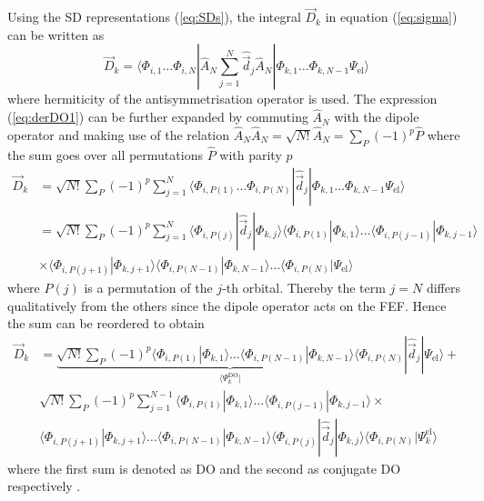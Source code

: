 Using the SD representations (\ref{eq:SDs}), the integral $\vec{D}_k$ in equation (\ref{eq:sigma}) can be written as
\begin{equation} \label{eq:derDO1}
\vec{D}_k = \langle
\Phi_{i,1}  \hdots\Phi_{i,N} | \hat{A}_N \sum_{j=1}^N\hat{\vec{d}}_j \hat{A}_N |
\Phi_{k,1}\hdots\Phi_{k,N-1} \Psi_\text{el} 
\rangle 
\end{equation}
where hermiticity of the antisymmetrisation operator is used.
The expression (\ref{eq:derDO1}) can be further expanded by commuting $\hat{A}_N$ with the dipole operator and making use of the relation $\hat{A}_N\hat{A}_N=\sqrt{N!}\hat{A}_N=\sum_P (-1)^p \hat{P}$ where the sum goes over all permutations $\hat{P}$ with parity $p$
\begin{align} \label{eq:derDO2}
\vec{D}_k & = \sqrt{N!}\sum_P (-1)^p \sum_{j=1}^N \langle
\Phi_{i,P(1)}\hdots\Phi_{i,P(N)} |\hat{\vec{d}}_j |
\Phi_{k,1}\hdots\Phi_{k,N-1} \Psi_\text{el}  \rangle  \\
  & = \sqrt{N!}\sum_P (-1)^p \sum_{j=1}^N 
  \langle \Phi_{i,P(j)} | \hat{\vec{d}}_j | \Phi_{k,j} \rangle
          \langle \Phi_{i,P(1)}  |\Phi_{k,1}   \rangle
  \hdots  \langle \Phi_{i,P(j-1)}|\Phi_{k,j-1} \rangle \\
  & \times\langle \Phi_{i,P(j+1)}|\Phi_{k,j+1} \rangle
          \langle \Phi_{i,P(N-1)}|\Phi_{k,N-1} \rangle
  \hdots  \langle \Phi_{i,P(N)}  |\Psi_\text{el}\rangle 
\end{align}
where $P(j)$ is a permutation of the $j$-th orbital.
Thereby the term $j=N$ differs qualitatively from the others since the dipole operator acts on the FEF.
Hence the sum can be reordered to obtain
\begin{align} \label{eq:fullDO}
  \vec{D}_k & = 
  \underbrace{\sqrt{N!}\sum_P (-1)^p 
          \langle \Phi_{i,P(1)}  |\Phi_{k,1}    \rangle
  \hdots  \langle \Phi_{i,P(N-1)}|\Phi_{k,N-1}  \rangle
  \langle \Phi_{i,P(N)} }_{\langle \Psi_k^\text{DO}|} | \hat{\vec{d}}_j | \Psi_\text{el} \rangle + \nonumber \\
  & 
       \sqrt{N!}\sum_P (-1)^p \sum_{j=1}^{N-1} 
          \langle \Phi_{i,P(1)}  |\Phi_{k,1}    \rangle
  \hdots  \langle \Phi_{i,P(j-1)}|\Phi_{k,j-1}  \rangle \times \nonumber \\
  &       \langle \Phi_{i,P(j+1)}|\Phi_{k,j+1}  \rangle
  \hdots  \langle \Phi_{i,P(N-1)}|\Phi_{k,N-1}  \rangle
 \langle \Phi_{i,P(j)}|\hat{\vec{d}}_j |\Phi_{k,j}\rangle
  \langle \Phi_{i,P(N)}| \Psi_k^\text{el} \rangle
\end{align}
where the first sum is denoted as DO and the second as conjugate DO respectively \cite{saPonzi}.

